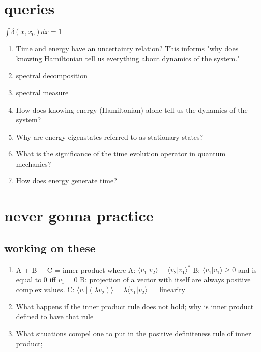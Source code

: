 \documentclass{article}
\begin{document}
\section{queries}
$\int \delta(x, x_0) dx = 1$

\begin{enumerate}
    \item Time and energy have an uncertainty relation? This informs "why does knowing Hamiltonian tell us everything about dynamics of the system." 
    \item spectral decomposition 
    \item spectral measure 
    \item How does knowing energy (Hamiltonian) alone tell us the dynamics of the system? 
    \item Why are energy eigenstates referred to as stationary states? 
    \item What is the significance of the time evolution operator in quantum mechanics?
    \item How does energy generate time? 

\end{enumerate}
\section{never gonna practice}

\subsection*{working on these}
\begin{enumerate}
    
    \item A + B + C = inner product where 
        \subitem A: $ \langle v_1 | v_2 \rangle = \langle v_2 | v_1 \rangle^*$ 
        \subitem B: $ \langle v_1 | v_1 \rangle \ge 0 $ and is equal to 0 iff $ v_1 = 0 $
        \subitem B: projection of a vector with itself are always positive complex values.
        \subitem C: $ \langle v_1 | (\lambda v_2)\rangle = \lambda \langle v_1 | v_2 \rangle = $ linearity 
    \item What happens if the inner product rule does not hold; why is inner product defined to have that rule

    \item What situations compel one to put in the positive definiteness rule of inner product;

\end{enumerate}

    
\end{document}
